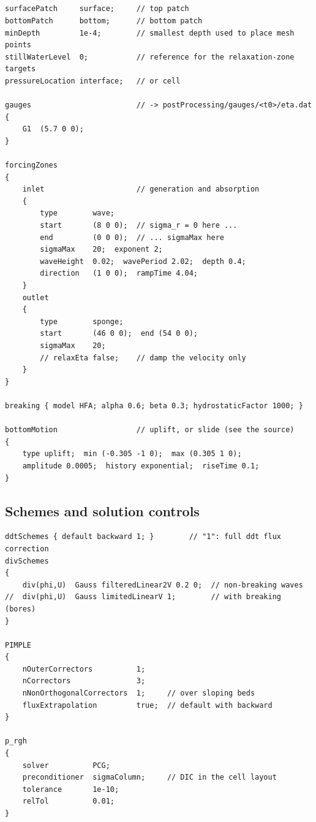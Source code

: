 \subsection{}

\begin{verbatim}
surfacePatch     surface;     // top patch
bottomPatch      bottom;      // bottom patch
minDepth         1e-4;        // smallest depth used to place mesh points
stillWaterLevel  0;           // reference for the relaxation-zone targets
pressureLocation interface;   // or cell

gauges                        // -> postProcessing/gauges/<t0>/eta.dat
{
    G1  (5.7 0 0);
}

forcingZones
{
    inlet                     // generation and absorption
    {
        type        wave;
        start       (8 0 0);  // sigma_r = 0 here ...
        end         (0 0 0);  // ... sigmaMax here
        sigmaMax    20;  exponent 2;
        waveHeight  0.02;  wavePeriod 2.02;  depth 0.4;
        direction   (1 0 0);  rampTime 4.04;
    }
    outlet
    {
        type        sponge;
        start       (46 0 0);  end (54 0 0);
        sigmaMax    20;
        // relaxEta false;    // damp the velocity only
    }
}

breaking { model HFA; alpha 0.6; beta 0.3; hydrostaticFactor 1000; }

bottomMotion                  // uplift, or slide (see the source)
{
    type uplift;  min (-0.305 -1 0);  max (0.305 1 0);
    amplitude 0.0005;  history exponential;  riseTime 0.1;
}
\end{verbatim}

\subsection{Schemes and solution controls}

\begin{verbatim}
ddtSchemes { default backward 1; }        // "1": full ddt flux correction
divSchemes
{
    div(phi,U)  Gauss filteredLinear2V 0.2 0;  // non-breaking waves
//  div(phi,U)  Gauss limitedLinearV 1;        // with breaking (bores)
}

PIMPLE
{
    nOuterCorrectors          1;
    nCorrectors               3;
    nNonOrthogonalCorrectors  1;     // over sloping beds
    fluxExtrapolation         true;  // default with backward
}

p_rgh
{
    solver          PCG;
    preconditioner  sigmaColumn;     // DIC in the cell layout
    tolerance       1e-10;
    relTol          0.01;
}
\end{verbatim}

